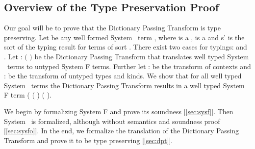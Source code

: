 \subsection{Overview of the Type Preservation Proof}
Our goal will be to prove that the Dictionary Passing Transform is type preserving. Let  be any well formed System \Fo\ term    \Constr{:} , where  is a  ,  is a   and s' is the sort of the typing result for terms of sort . There exist two cases for typings:    \Constr{:}  and    \Constr{:} . Let  : $($   \Constr{:} $)$    be the Dictionary Passing Transform that translates well typed System \Fo\ terms to untyped System F terms. Further let  :    be the transform of contexts and  :      be the transform of untyped types and kinds. We show that for all well typed System \Fo\  terms  the Dictionary Passing Transform results in a well typed System F term (   ( ) \Constr{:} ( ). 

\noindent We begin by formalizing System F and prove its soundness [\ref{sec:sysf}]. Then System \Fo\ is formalized, although without semantics and soundness proof [\ref{sec:sysfo}]. In the end, we formalize the translation of the Dictionary Passing Transform and prove it to be type preserving [\ref{sec:dpt}].